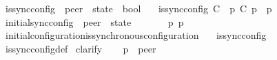 \begin{isabellebody}
\isadelimdocument
%
\endisadelimdocument
%
\isatagdocument
%
\isamarkuptrue%
%
\endisatagdocument
{\isafolddocument}%
%
\isadelimdocument
%
\endisadelimdocument
{}\isamarkupfalse%
\ is{\isacharunderscore}{\kern0pt}sync{\isacharunderscore}{\kern0pt}config\ {\isacharcolon}{\kern0pt}{\isacharcolon}{\kern0pt}\ {\isachardoublequoteopen}{\isacharparenleft}{\kern0pt}{\isacharprime}{\kern0pt}peer\ {\isasymRightarrow}\ {\isacharprime}{\kern0pt}state{\isacharparenright}{\kern0pt}\ {\isasymRightarrow}\ bool{\isachardoublequoteclose}\ \isanewline
\ \ {\isachardoublequoteopen}is{\isacharunderscore}{\kern0pt}sync{\isacharunderscore}{\kern0pt}config\ C\ {\isasymequiv}\ {\isacharparenleft}{\kern0pt}{\isasymforall}p{\isachardot}{\kern0pt}\ C\ p\ {\isasymin}\ {\isasymS}{\isacharparenleft}{\kern0pt}p{\isacharparenright}{\kern0pt}{\isacharparenright}{\kern0pt}{\isachardoublequoteclose}\isanewline
\isanewline
{}\isamarkupfalse%
\ initial{\isacharunderscore}{\kern0pt}sync{\isacharunderscore}{\kern0pt}config\ {\isacharcolon}{\kern0pt}{\isacharcolon}{\kern0pt}\ {\isachardoublequoteopen}{\isacharprime}{\kern0pt}peer\ {\isasymRightarrow}\ {\isacharprime}{\kern0pt}state{\isachardoublequoteclose}\ \ {\isacharparenleft}{\kern0pt}{\isachardoublequoteopen}{\isasymC}\isactrlsub {\isasymI}\isactrlsub {\isasymzero}{\isachardoublequoteclose}{\isacharparenright}{\kern0pt}\ \isanewline
\ \ {\isachardoublequoteopen}{\isasymC}\isactrlsub {\isasymI}\isactrlsub {\isasymzero}\ {\isasymequiv}\ {\isasymlambda}p{\isachardot}{\kern0pt}\ {\isasymI}{\isacharparenleft}{\kern0pt}p{\isacharparenright}{\kern0pt}{\isachardoublequoteclose}\isanewline
\isanewline
{}\isamarkupfalse%
\ initial{\isacharunderscore}{\kern0pt}configuration{\isacharunderscore}{\kern0pt}is{\isacharunderscore}{\kern0pt}synchronous{\isacharunderscore}{\kern0pt}configuration{\isacharcolon}{\kern0pt}\isanewline
\ \ \ {\isachardoublequoteopen}is{\isacharunderscore}{\kern0pt}sync{\isacharunderscore}{\kern0pt}config\ {\isasymC}\isactrlsub {\isasymI}\isactrlsub {\isasymzero}{\isachardoublequoteclose}\isanewline
%
\isadelimproof
\ \ %
\endisadelimproof
%
\isatagproof
{}\isamarkupfalse%
\ is{\isacharunderscore}{\kern0pt}sync{\isacharunderscore}{\kern0pt}config{\isacharunderscore}{\kern0pt}def\isanewline
{}\isamarkupfalse%
\ clarify\isanewline
\ \ \isamarkupfalse%
\ p\ {\isacharcolon}{\kern0pt}{\isacharcolon}{\kern0pt}\ {\isachardoublequoteopen}{\isacharprime}{\kern0pt}peer{\isachardoublequoteclose}\isanewline

\end{isabellebody}
